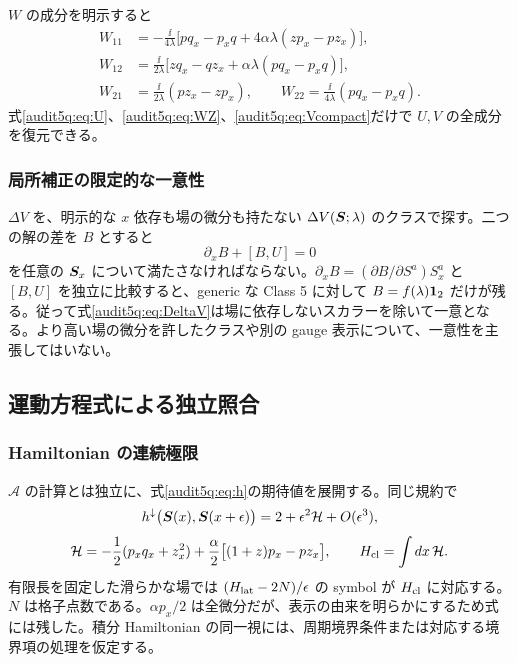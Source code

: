 $W$ の成分を明示すると
\begin{align}
W_{11}&=-\frac{\ii}{4\lambda}
\bigl[pq_x-p_xq+4\alpha\lambda(zp_x-pz_x)\bigr],\label{audit5q:eq:W11}\\
W_{12}&=\frac{\ii}{2\lambda}
\bigl[zq_x-qz_x+\alpha\lambda(pq_x-p_xq)\bigr],\\
W_{21}&=\frac{\ii}{2\lambda}(pz_x-zp_x),\qquad
W_{22}=\frac{\ii}{4\lambda}(pq_x-p_xq).
\end{align}
式\eqref{audit5q:eq:U}、\eqref{audit5q:eq:WZ}、\eqref{audit5q:eq:Vcompact}だけで $U,V$ の全成分を復元できる。

\subsubsection{局所補正の限定的な一意性}

$\Delta V$ を、明示的な $x$ 依存も場の微分も持たない $\Delta V(\boldsymbol S;\lambda)$ のクラスで探す。二つの解の差を $B$ とすると
\begin{equation}
\partial_x B+[B,U]=0
\end{equation}
を任意の $\boldsymbol S_x$ について満たさなければならない。$\partial_xB=(\partial B/\partial S^a)S_x^a$ と $[B,U]$ を独立に比較すると、generic な Class 5 に対して $B=f(\lambda)\mathbf 1_2$ だけが残る。従って式\eqref{audit5q:eq:DeltaV}は場に依存しないスカラーを除いて一意となる。より高い場の微分を許したクラスや別の gauge 表示について、一意性を主張してはいない。

\subsection{運動方程式による独立照合}
\subsubsection{Hamiltonian の連続極限}

$\widehat{\mathcal A}$ の計算とは独立に、式\eqref{audit5q:eq:h}の期待値を展開する。同じ規約で
\begin{equation}
h^{\downarrow}\bigl(\boldsymbol S(x),\boldsymbol S(x+\epsilon)\bigr)
=2+\epsilon^2\mathcal H+O(\epsilon^3),
\end{equation}
\begin{equation}
\mathcal H=-\frac12(p_xq_x+z_x^2)
+\frac\alpha2\bigl[(1+z)p_x-pz_x\bigr],\qquad
H_{\rm cl}=\int dx\,\mathcal H.
\label{audit5q:eq:Hcl}
\end{equation}
有限長を固定した滑らかな場では $(H_{\rm lat}-2N)/\epsilon$ の symbol が $H_{\rm cl}$ に対応する。$N$ は格子点数である。$\alpha p_x/2$ は全微分だが、表示の由来を明らかにするため式には残した。積分 Hamiltonian の同一視には、周期境界条件または対応する境界項の処理を仮定する。

